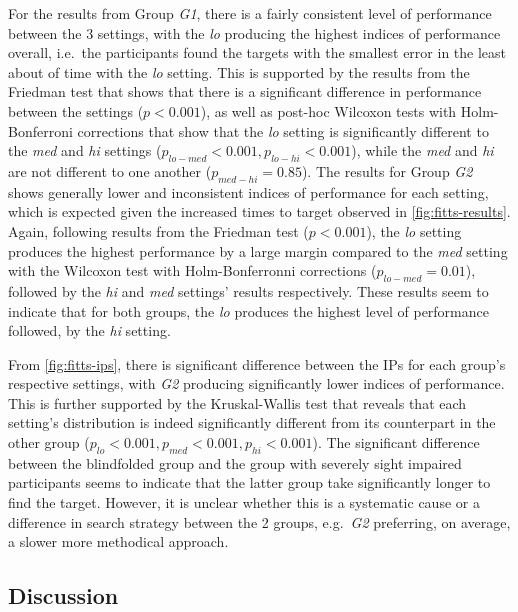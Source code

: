 \documentclass[]{interact}
\begin{document}
For the results from Group \textit{G1}, there is a fairly consistent level of performance between the 3 settings, with the \textit{lo} producing the highest indices of performance overall, i.e.\ the participants found the targets with the smallest error in the least about of time with the \textit{lo} setting.
This is supported by the results from the Friedman test that shows that there is a significant difference in performance between the settings ($p < 0.001$), as well as post-hoc Wilcoxon tests with Holm-Bonferroni corrections that show that the \textit{lo} setting is significantly different to the \textit{med} and \textit{hi} settings ($p_{lo-med} < 0.001, p_{lo-hi} < 0.001$), while the \textit{med} and \textit{hi} are not different to one another ($p_{med-hi} = 0.85$).
The results for Group \textit{G2} shows generally lower and inconsistent indices of performance for each setting, which is expected given the increased times to target observed in \cref{fig:fitts-results}.
Again, following results from the Friedman test ($p < 0.001$), the \textit{lo} setting produces the highest performance by a large margin compared to the \textit{med} setting with the Wilcoxon test with Holm-Bonferronni corrections ($p_{lo-med}=0.01$), followed by the \textit{hi} and \textit{med} settings' results respectively.
These results seem to indicate that for both groups, the \textit{lo} produces the highest level of performance followed, by the \textit{hi} setting.

From \cref{fig:fitts-ips}, there is significant difference between the IPs for each group's respective settings, with \textit{G2} producing significantly lower indices of performance.
This is further supported by the Kruskal-Wallis test that reveals that each setting's distribution is indeed significantly different from its counterpart in the other group ($p_{lo} < 0.001, p_{med} < 0.001, p_{hi} < 0.001$).
The significant difference between the blindfolded group and the group with severely sight impaired participants seems to indicate that the latter group take significantly longer to find the target. 
However, it is unclear whether this is a systematic cause or a difference in search strategy between the 2 groups, e.g.\ \textit{G2} preferring, on average, a slower more methodical approach.

\subsection{Discussion}
\end{document}

